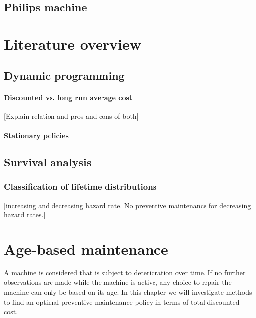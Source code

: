 \section{Philips machine}

\chapter{Literature overview}
\section{Dynamic programming}
\subsubsection{Discounted vs. long run average cost}
[Explain relation and pros and cons of both]
\subsubsection{Stationary policies}
\section{Survival analysis}
\subsection{Classification of lifetime distributions}
[increasing and decreasing hazard rate. No preventive maintenance for decreasing hazard rates.]


\chapter{Age-based maintenance}\label{chapter:AgeBased}
A machine is considered that is subject to deterioration over time.
If no further observations are made while the machine is active, any choice to repair the machine can only be based on its age.
In this chapter we will investigate methods to find an optimal preventive maintenance policy in terms of total discounted cost.







